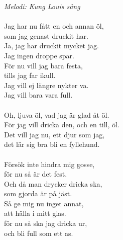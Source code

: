 {\footnotesize\textit{Melodi: Kung Louis sång}}\\
\\
Jag har nu fått en och annan öl,\\
som jag genast druckit har.\\
Ja, jag har druckit mycket jag.\\
Jag ingen droppe spar.\\
För nu vill jag bara festa,\\
tills jag far ikull.\\
Jag vill ej längre nykter va.\\
Jag vill bara vara full.\\
\\
Oh, ljuva öl, vad jag är glad åt öl.\\
För jag vill dricka den, och en till, öl.\\
Det vill jag nu, ett djur som jag,\\
det lär sig bra bli en fyllehund.\\
\\
Försök inte hindra mig gosse,\\
för nu så är det fest.\\
Och då man drycker dricka ska,\\
som gjorda är på jäst.\\
Så ge mig nu inget annat,\\
att hälla i mitt glas.\\
för nu så ska jag dricka ur,\\
och bli full som ett as.
